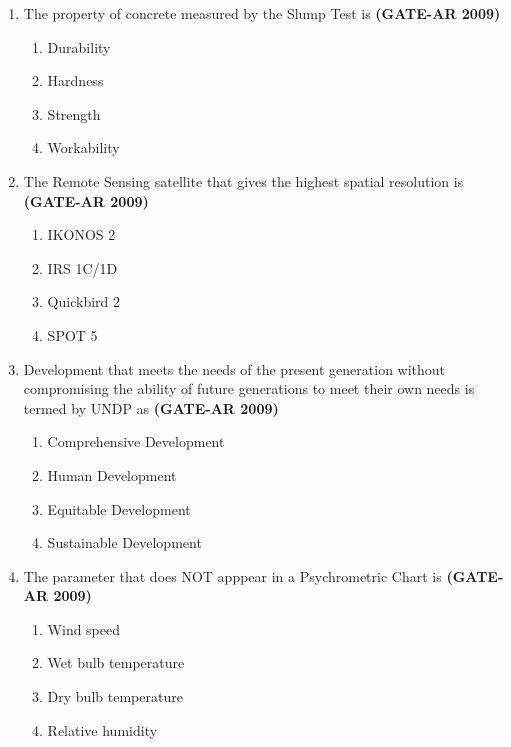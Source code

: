 \documentclass[a4paper,10pt]{article}
\begin{document}
\begin{enumerate}
    \item The property of concrete measured by the Slump Test is \hfill \textbf{(GATE-AR 2009)}
    \begin{multicols}{4}
	\begin{enumerate}
        \item Durability
        \item Hardness
        \item Strength
        \item Workability
    \end{enumerate}
	\end{multicols}
    
    \item The Remote Sensing satellite that gives the highest spatial resolution is \hfill \textbf{(GATE-AR 2009)}
    \begin{multicols}{4}
	\begin{enumerate}
        \item IKONOS 2
        \item IRS 1C/1D
        \item Quickbird 2
        \item SPOT 5
    \end{enumerate}
	\end{multicols}
    
    \item Development that meets the needs of the present generation without compromising the ability of future generations to meet their own needs is termed by UNDP as \hfill \textbf{(GATE-AR 2009)}
    \begin{multicols}{2}
	\begin{enumerate}
        \item Comprehensive Development
        \item Human Development
        \item Equitable Development
        \item Sustainable Development
    \end{enumerate}
	\end{multicols}

	\item The parameter that does NOT apppear in a Psychrometric Chart is \hfill \textbf{(GATE-AR 2009)}
    \begin{multicols}{2}
	\begin{enumerate}
        \item Wind speed
        \item Wet bulb temperature
        \item Dry bulb temperature
        \item Relative humidity
    \end{enumerate}
	\end{multicols}


\end{enumerate}
\end{document}
